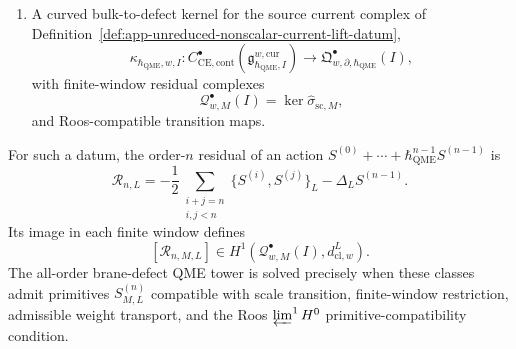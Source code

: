 \begin{defn}
\begin{enumerate}
\[      =
      Q+\{S^{(0)}[L],-\}_L
  \]
  on the obstruction complex, and the completed quantum BV differential
  after a solution has been constructed,
  \[
    d_{\mathrm{QME},w}^{L}
      =
      Q+\{I^w[L],-\}_L+\hbar_{\mathrm{QME}}\Delta_L
  \]
  together with a scalar-contact projection stable under
  \(d_{\mathrm{cl},w}^{L}\) and under the finite-stage quantum
  differentials produced by the recursion,
  \[
    \widehat\sigma_{\mathrm{sc}}\colon
    \mathfrak Q^\bullet_{w,\partial,\hbar_{\mathrm{QME}}}(I)
      \to
    C^\bullet_{\mathrm{Lie}}(\bar A;\C\gamma_{\mathbf 1})[1]
      [[\hbar_{\mathrm{QME}}]] .
  \]
  \item A curved bulk-to-defect kernel for the source current complex of
  Definition~\ref{def:app-unreduced-nonscalar-current-lift-datum},
  \[
    \kappa_{\hbar_{\mathrm{QME}},w,I}\colon
    C^\bullet_{\mathrm{CE},\mathrm{cont}}
    (\mathfrak g^{w,\mathrm{cur}}_{\hbar_{\mathrm{QME}},I})
      \longrightarrow
    \mathfrak Q^\bullet_{w,\partial,\hbar_{\mathrm{QME}}}(I),
  \]
  with finite-window residual complexes
  \[
    \mathcal Q^\bullet_{w,M}(I)
      =
      \ker\widehat\sigma_{\mathrm{sc},M},
  \]
  and Roos-compatible transition maps.
\end{enumerate}
For such a datum, the order-\(n\) residual of an action
\(S^{(0)}+\cdots+\hbar_{\mathrm{QME}}^{n-1}S^{(n-1)}\) is
\begin{equation}
\label{app:eq:qme-order-recursion}
  \mathcal R_{n,L}
    =
    -\frac12
    \sum_{\substack{i+j=n\\ i,j<n}}
      \{S^{(i)},S^{(j)}\}_L
    -\Delta_L S^{(n-1)} .
\end{equation}
  Its image in each finite window defines
  \[
  [\mathcal R_{n,M,L}]
    \in H^1(\mathcal Q^\bullet_{w,M}(I),d_{\mathrm{cl},w}^{L}).
  \]
The all-order brane-defect QME tower is solved precisely when these
classes admit primitives \(S^{(n)}_{M,L}\) compatible with scale
transition, finite-window restriction, admissible weight transport, and
the Roos \(\varprojlim^1H^0\) primitive-compatibility condition.
\end{defn}

